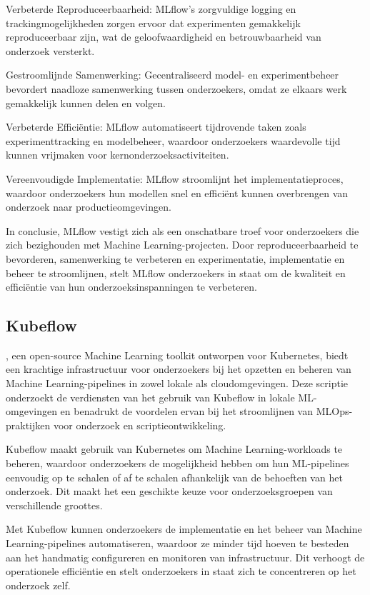 Verbeterde Reproduceerbaarheid: MLflow's zorgvuldige logging en trackingmogelijkheden zorgen ervoor dat experimenten gemakkelijk reproduceerbaar zijn, wat de geloofwaardigheid en betrouwbaarheid van onderzoek versterkt.

Gestroomlijnde Samenwerking: Gecentraliseerd model- en experimentbeheer bevordert naadloze samenwerking tussen onderzoekers, omdat ze elkaars werk gemakkelijk kunnen delen en volgen.

Verbeterde Efficiëntie: MLflow automatiseert tijdrovende taken zoals experimenttracking en modelbeheer, waardoor onderzoekers waardevolle tijd kunnen vrijmaken voor kernonderzoeksactiviteiten.

Vereenvoudigde Implementatie: MLflow stroomlijnt het implementatieproces, waardoor onderzoekers hun modellen snel en efficiënt kunnen overbrengen van onderzoek naar productieomgevingen.

In conclusie, MLflow vestigt zich als een onschatbare troef voor onderzoekers die zich bezighouden met Machine Learning-projecten. Door reproduceerbaarheid te bevorderen, samenwerking te verbeteren en experimentatie, implementatie en beheer te stroomlijnen, stelt MLflow onderzoekers in staat om de kwaliteit en efficiëntie van hun onderzoeksinspanningen te verbeteren.

\subsection{Kubeflow}

\autocite{Kubeflow2021}, een open-source Machine Learning toolkit ontworpen voor Kubernetes, biedt een krachtige infrastructuur voor onderzoekers bij het opzetten en beheren van Machine Learning-pipelines in zowel lokale als cloudomgevingen. Deze scriptie onderzoekt de verdiensten van het gebruik van Kubeflow in lokale ML-omgevingen en benadrukt de voordelen ervan bij het stroomlijnen van MLOps-praktijken voor onderzoek en scriptieontwikkeling.

Kubeflow maakt gebruik van Kubernetes om Machine Learning-workloads te beheren, waardoor onderzoekers de mogelijkheid hebben om hun ML-pipelines eenvoudig op te schalen of af te schalen afhankelijk van de behoeften van het onderzoek. Dit maakt het een geschikte keuze voor onderzoeksgroepen van verschillende groottes.

Met Kubeflow kunnen onderzoekers de implementatie en het beheer van Machine Learning-pipelines automatiseren, waardoor ze minder tijd hoeven te besteden aan het handmatig configureren en monitoren van infrastructuur. Dit verhoogt de operationele efficiëntie en stelt onderzoekers in staat zich te concentreren op het onderzoek zelf.

